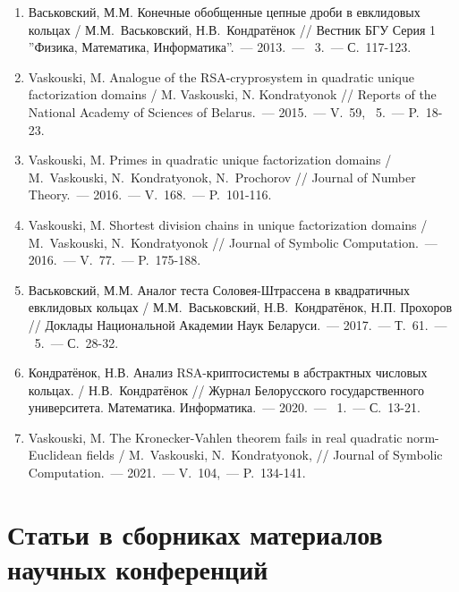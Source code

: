 \documentclass[_00_autoref.tex]{subfiles}
\begin{document}
\begin{enumerate}

    \item \label{source:Vestnik_BSU_2013}
    Васьковский, М.М. Конечные обобщенные цепные дроби в евклидовых кольцах / М.М.~Васьковский, Н.В.~Кондратёнок // Вестник БГУ Серия 1 ''Физика, Математика, Информатика''.~--- 2013.~--- \textnumero~3.~--- С.~117-123.

    \item \label{source:NANB_2015}
    Vaskouski, M. Analogue of the RSA-cryprosystem in quadratic unique factorization domains / M. Vaskouski, N. Kondratyonok // Reports of the National Academy of Sciences of Belarus.~--- 2015.~--- V.~59, \textnumero~5.~--- P.~18-23.

    \item \label{source:JNT_2016}
    Vaskouski, M. Primes in quadratic unique factorization domains / M.~Vaskouski, N.~Kondratyonok, N.~Prochorov // Journal of Number Theory.~--- 2016.~--- V.~168.~--- P.~101-116.

    \item \label{source:JSC_2016}
    Vaskouski, M. Shortest division chains in unique factorization domains / M.~Vaskouski, N.~Kondratyonok // Journal of Symbolic Computation.~--- 2016.~--- V.~77.~--- P.~175-188.

    \item \label{source:NANB_2017}
    Васьковский, М.М. Аналог теста Соловея-Штрассена в квадратичных евклидовых кольцах / М.М.~Васьковский, Н.В.~Кондратёнок, Н.П. Прохоров // Доклады Национальной Академии Наук Беларуси.~--- 2017.~--- Т.~61.~--- \textnumero~5.~--- С.~28-32.

    \item \label{source:BSU_Journal_2020}
    Кондратёнок, Н.В. Анализ RSA-криптосистемы в абстрактных числовых кольцах. / Н.В.~Кондратёнок // Журнал Белорусского государственного университета. Математика. Информатика.~--- 2020.~--- \textnumero~1.~--- С.~13-21.

    \item \label{source:JSC_2021}
    Vaskouski, M. The Kronecker-Vahlen theorem fails in real quadratic norm-Euclidean fields / M.~Vaskouski, N.~Kondratyonok, // Journal of Symbolic Computation.~--- 2021.~--- V.~104,~--- P.~134-141.
\end{enumerate}

\vspace{-4ex}
\section*{\fontsize{14}{15}\selectfont Статьи в сборниках материалов научных конференций}
\vspace{-4ex}
\end{document}
